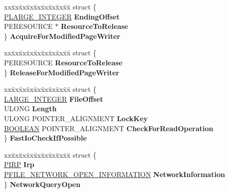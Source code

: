 \begin{DoxyCompactItemize}
\begin{tabbing}
\end{tabbing}\item 
\mbox{\label{union___f_l_t___p_a_r_a_m_e_t_e_r_s_a293d92a246ceda0294287307180498c0}} 
\begin{tabbing}
xx\=xx\=xx\=xx\=xx\=xx\=xx\=xx\=xx\=\kill
struct \{\\
\>\hyperlink{union___l_a_r_g_e___i_n_t_e_g_e_r}{PLARGE\_INTEGER} {\bfseries EndingOffset}\\
\>PERESOURCE $\ast$ {\bfseries ResourceToRelease}\\
\} {\bfseries AcquireForModifiedPageWriter}\\

\end{tabbing}\item 
\mbox{\label{union___f_l_t___p_a_r_a_m_e_t_e_r_s_ae6d3a57d9df8d4bb36d82b6cf6d40ced}} 
\begin{tabbing}
xx\=xx\=xx\=xx\=xx\=xx\=xx\=xx\=xx\=\kill
struct \{\\
\>PERESOURCE {\bfseries ResourceToRelease}\\
\} {\bfseries ReleaseForModifiedPageWriter}\\

\end{tabbing}\item 
\mbox{\label{union___f_l_t___p_a_r_a_m_e_t_e_r_s_afa133bb8107410841820ee48cd2649b0}} 
\begin{tabbing}
xx\=xx\=xx\=xx\=xx\=xx\=xx\=xx\=xx\=\kill
struct \{\\
\>\hyperlink{union___l_a_r_g_e___i_n_t_e_g_e_r}{LARGE\_INTEGER} {\bfseries FileOffset}\\
\>ULONG {\bfseries Length}\\
\>ULONG POINTER\_ALIGNMENT {\bfseries LockKey}\\
\>\hyperlink{_processor_bind_8h_a112e3146cb38b6ee95e64d85842e380a}{BOOLEAN} POINTER\_ALIGNMENT {\bfseries CheckForReadOperation}\\
\} {\bfseries FastIoCheckIfPossible}\\

\end{tabbing}\item 
\mbox{\label{union___f_l_t___p_a_r_a_m_e_t_e_r_s_ad7e789d2a2e2cb0c9cab32c5e0e626ed}} 
\begin{tabbing}
xx\=xx\=xx\=xx\=xx\=xx\=xx\=xx\=xx\=\kill
struct \{\\
\>\hyperlink{interfacevoid}{PIRP} {\bfseries Irp}\\
\>\hyperlink{struct___f_i_l_e___n_e_t_w_o_r_k___o_p_e_n___i_n_f_o_r_m_a_t_i_o_n}{PFILE\_NETWORK\_OPEN\_INFORMATION} {\bfseries NetworkInformation}\\
\} {\bfseries NetworkQueryOpen}\\


\end{tabbing}
\end{DoxyCompactItemize}
